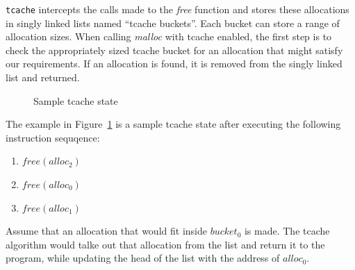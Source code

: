 \documentclass{article}
\begin{document}
\texttt{tcache} intercepts the calls made to the \emph{free} function and stores these allocations in singly linked lists named ``tcache buckets''. Each bucket can store a range of allocation sizes. When calling \emph{malloc} with tcache enabled, the first step is to check the appropriately sized tcache bucket for an allocation that might satisfy our requirements. If an allocation is found, it is removed from the singly linked list and returned.

\begin{figure}[ht]%
  \centering
  \caption{\label{fig:tcache} Sample tcache state}%
\end{figure}

The example in Figure~\ref{fig:tcache} is a sample tcache state after executing the following instruction sequqence:
\begin{enumerate}
  \item $free(alloc_{2})$
  \item $free(alloc_{0})$
  \item $free(alloc_{1})$
\end{enumerate}
Assume that an allocation that would fit inside $bucket_{0}$ is made. The tcache algorithm would talke out that allocation from the list and return it to the program, while updating the head of the list with the address of $alloc_{0}$.
\end{document}
